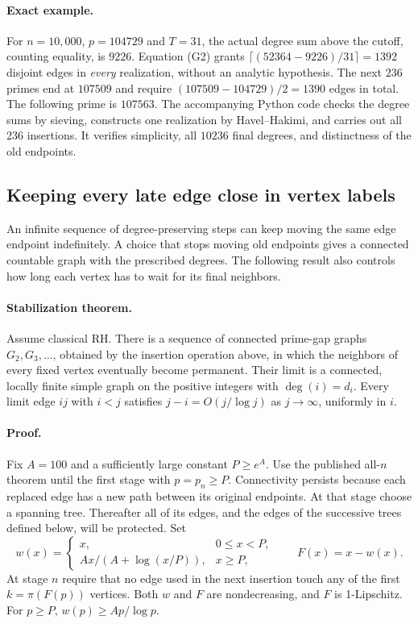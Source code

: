 \paragraph{Exact example.}
For $n=10{,}000$, $p=104729$ and $T=31$, the actual degree sum above
the cutoff, counting equality, is $9226$. Equation (G2) grants
$\lceil(52364-9226)/31\rceil=1392$ disjoint edges in \emph{every}
realization, without an analytic hypothesis. The next 236 primes end
at $107509$ and require $(107509-104729)/2=1390$ edges in total.
The following prime is $107563$. The accompanying Python code checks the
degree sums by sieving, constructs one realization by Havel--Hakimi,
and carries out all 236 insertions. It verifies simplicity, all $10236$
final degrees, and distinctness of the old endpoints.

\subsection{Keeping every late edge close in vertex labels}
An infinite sequence of degree-preserving steps can keep moving the same
edge endpoint indefinitely. A choice that stops moving old endpoints gives
a connected countable graph with the prescribed degrees. The following
result also controls how long each vertex has to wait for its final neighbors.

\paragraph{Stabilization theorem.}
Assume classical RH. There is a sequence of connected prime-gap graphs
$G_2,G_3,\ldots$, obtained by the insertion operation above, in which
the neighbors of every fixed vertex eventually become permanent.
Their limit is a connected, locally finite simple graph on the positive
integers with $\deg(i)=d_i$. Every limit edge $ij$ with $i<j$ satisfies
$j-i=O(j/\log j)$ as $j\to\infty$, uniformly in $i$.

\paragraph{Proof.}
Fix $A=100$ and a sufficiently large constant $P\ge e^{A}$. Use the
published all-$n$ theorem until the first stage with $p=p_n\ge P$.
Connectivity persists because each replaced edge has a new path
between its original endpoints. At that stage choose a spanning tree.
Thereafter all of its edges, and the edges of the successive trees
defined below, will be protected. Set
\[
 w(x)=\begin{cases}
 x,&0\le x<P,\\
 Ax/(A+\log(x/P)),&x\ge P,
 \end{cases}
 \qquad F(x)=x-w(x).
\]
At stage $n$ require that no edge used in the next insertion touch
any of the first $k=\pi(F(p))$ vertices. Both $w$ and $F$ are
nondecreasing, and $F$ is 1-Lipschitz. For $p\ge P$,
$w(p)\ge Ap/\log p$.

